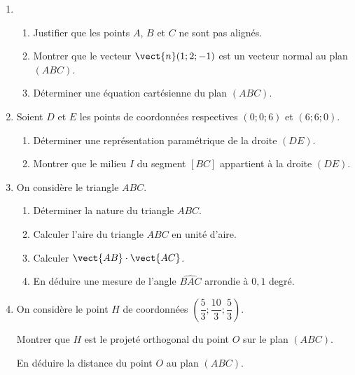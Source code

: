 \begin{enumerate}
	\item 
	\begin{enumerate}
		\item Justifier que les points $A$, $B$ et $C$ ne sont pas alignés.
		\item Montrer que le vecteur $\vect{n}(1;2;-1)$ est un vecteur normal au plan $(ABC)$.
		\item Déterminer une équation cartésienne du plan $(ABC)$.
	\end{enumerate}
	\item Soient $D$ et $E$ les points de coordonnées respectives $(0;0;6)$ et $(6;6;0)$.
	\begin{enumerate}
		\item Déterminer une représentation paramétrique de la droite $(DE)$.
		\item Montrer que le milieu $I$ du segment $[BC]$ appartient à la droite $(DE)$.
	\end{enumerate}
	\item On considère le triangle $ABC$.
	\begin{enumerate}
		\item Déterminer la nature du triangle $ABC$.
		\item Calculer l'aire du triangle $ABC$ en unité d'aire.
		\item Calculer $\vect{AB}  \cdot \vect{AC}$.
		\item En déduire une mesure de l'angle $\widehat{BAC}$ arrondie à $0,1$ degré.
	\end{enumerate}	
	\item On considère le point $H$ de coordonnées $\left(\dfrac53;\dfrac{10}{3};\dfrac53\right)$.
	
	Montrer que $H$ est le projeté orthogonal du point $O$ sur le plan $(ABC)$.
	
	En déduire la distance du point $O$ au plan $(ABC)$.
\end{enumerate}